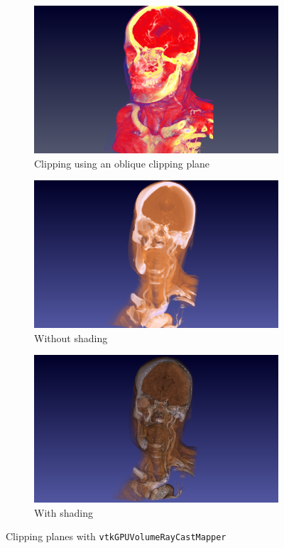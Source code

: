 \begin{figure}[htb]
  \centering
  \begin{subfigure}[b]{\columnwidth}
    \includegraphics[width=\textwidth]{HeadClippingOblique.png}
    \caption{Clipping using an oblique clipping plane}
    \label{fig:clipoblique}
  \end{subfigure}
  \begin{subfigure}[b]{.5\columnwidth}
    \includegraphics[width=\textwidth]{HeadClippingSlabNoShading.png}
    \caption{Without shading}
    \label{fig:clipnoshading}
  \end{subfigure}%
  \begin{subfigure}[b]{.5\columnwidth}
    \includegraphics[width=\textwidth]{HeadClippingSlabShading.png}
    \caption{With shading}
    \label{fig:clipshading}
  \end{subfigure}
  \caption{Clipping planes with \texttt{vtkGPUVolumeRayCastMapper}}
  \label{fig:clipping}
\end{figure}

